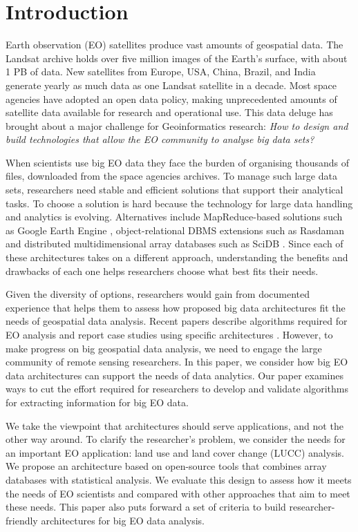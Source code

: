 \documentclass[a4paper, 11pt]{article}
\begin{document}
\section{Introduction}
\label{sec:introduction}

Earth observation (EO) satellites produce vast amounts of geospatial data. The Landsat archive holds over five million images of the Earth's surface, with about 1 PB of data. New satellites from Europe, USA, China, Brazil, and India generate yearly as much data as one Landsat satellite in a decade. Most space agencies have adopted an open data policy, making unprecedented amounts of satellite data available for research and operational use. This data deluge has brought about a major challenge for Geoinformatics research: \textit{How to design and build technologies that allow the EO community to analyse big data sets?}

When scientists use big EO data they face the burden of organising thousands of files, downloaded from the space agencies archives. To manage such large data sets, researchers need stable and efficient solutions that support their analytical tasks. To choose a solution is hard because the technology for large data handling and analytics is evolving. Alternatives include MapReduce-based solutions such as Google Earth Engine \cite{Gorelick2012}, object-relational DBMS extensions such as Rasdaman \cite{Baumann1998} and  distributed multidimensional array databases such as SciDB \cite{Stonebraker2013}. Since each of these architectures takes on a different approach, understanding the benefits and drawbacks of each one helps researchers choose what best fits their needs.

Given the diversity of options, researchers would gain from documented experience that helps them to assess how proposed big data architectures fit the needs of geospatial data analysis. Recent papers describe algorithms required for EO analysis \cite{Vatsavai2012} \cite{Nativi2015} and report case studies using specific architectures \cite{Planthaber2012}\cite{Krcal2015}. However, to make progress on big geospatial data analysis, we need to engage the large community of remote sensing researchers. In this paper, we consider how big EO data architectures can support the needs of data analytics. Our paper examines ways to cut the effort required for researchers to develop and validate algorithms for extracting information for big EO data.

We take the viewpoint that architectures should serve applications, and not the other way around. To clarify the researcher's problem, we consider the needs for an important EO application: land use and land cover change (LUCC) analysis. We propose an architecture based on open-source tools that combines array databases with statistical analysis.  We evaluate this design to assess how it meets the needs of EO scientists and compared with other approaches that aim to meet these needs. This paper also puts forward a set of criteria to build researcher-friendly architectures for big EO data analysis.



\end{document}
